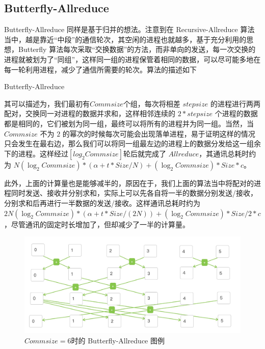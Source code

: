 \documentclass{article}
\begin{document}
\subsection{Butterfly-Allreduce}
Butterfly-Allreduce 同样是基于归并的想法。注意到在 Recursive-Allreduce 算法当中，越是靠近“中段”的通信轮次，其空闲的进程也就越多，基于充分利用的思想，Butterfly 算法每次采取“交换数据”的方法，而非单向的发送，每一次交换的进程就被划为了“同组”，这样同一组的进程保管着相同的数据，可以尽可能多地在每一轮利用进程，减少了通信所需要的轮次。算法的描述如下
\begin{breakablealgorithm}
	\caption{Butterfly-Allreduce}
	\begin{algorithmic}[1]
			\ELSE
			\ENDIF
			\ENDIF
			\ENDIF
			\ENDFOR
			\ENDIF
			\ENDFOR
	\end{algorithmic}
\end{breakablealgorithm}

其可以描述为，我们最初有$Commsize$个组，每次将相差 $stepsize$ 的进程进行两两配对，交换同一对进程的数据并求和，这样相邻连续的 $2*stepsize$ 个进程的数据都是相同的，它们被划为同一组，最终可以将所有的进程并为同一组。当然，当 $Commsize$ 不为 $2$ 的幂次的时候每次可能会出现落单进程，易于证明这样的情况只会发生在最右边，那么我们可以将同一组最左边的进程上的数据分发给这一组余下的进程。这样经过$[log_2 Commsize]$轮后就完成了 $Allreduce$，其通讯总耗时约为  $N(\log_2Commsize)*(\alpha+t*Size/N)+(\log_2 Commsize)*Size*c$。

此外，上面的计算量也是能够减半的，原因在于，我们上面的算法当中将配对的进程同时发送、接收并分别求和，实际上可以先各自将一半的数据分别发送/接收，分别求和后再进行一半数据的发送/接收。这样通讯总耗时约为 $2N(\log_2Commsize)*(\alpha+t*Size/(2N))+(\log_2 Commsize)*Size/2*c$，尽管通讯的固定时长增加了，但却减少了一半的计算量。
	\begin{figure}[H]
	\centering
	\includegraphics[width=0.8\linewidth]{./fig/butterfly}
	\caption{$Commsize = 6$时的 Butterfly-Allreduce 图例\label{fig:butterfly}}
\end{figure}
\end{document}
